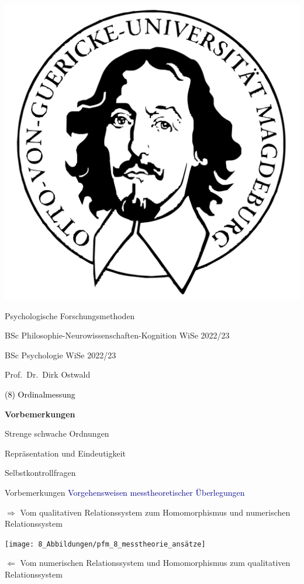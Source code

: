 \documentclass[
  8pt,
  ignorenonframetext,
]{beamer}
\author{}
\date{\vspace{-2.5em}}
\begin{document}
\begin{frame}[plain]{}
\protect\hypertarget{section}{}
\center

\begin{center}\includegraphics[width=0.2\linewidth]{8_Abbildungen/pfm_8_otto} \end{center}

\vspace{2mm}

\Large

Psychologische Forschungsmethoden \vspace{6mm}

\normalsize

BSc Philosophie-Neurowissenschaften-Kognition WiSe 2022/23

BSc Psychologie WiSe 2022/23

\large
\vspace{6mm}

Prof.~Dr.~Dirk Ostwald
\end{frame}

\begin{frame}[plain]{}
\protect\hypertarget{section-1}{}
\vfill
\center
\huge

\textcolor{black}{(8) Ordinalmessung} \vfill
\end{frame}

\begin{frame}{}
\protect\hypertarget{section-2}{}
\Large
{}
\vfill

\textbf{Vorbemerkungen}

Strenge schwache Ordnungen

Repräsentation und Eindeutigkeit

Selbstkontrollfragen \vfill
\end{frame}

\begin{frame}{Vorbemerkungen}
\protect\hypertarget{vorbemerkungen}{}
\textcolor{darkblue}{Vorgehensweisen messtheoretischer Überlegungen}

\small

\(\Rightarrow\) Vom qualitativen Relationssystem zum Homomorphismus und
numerischen Relationssystem

\begin{center}\texttt{[image: 8\_Abbildungen/pfm\_8\_messtheorie\_ansätze]} \end{center}

\small

\(\Leftarrow\) Vom numerischen Relationssystem und Homomorphismus zum
qualitativen Relationssystem
\end{frame}
\end{document}
